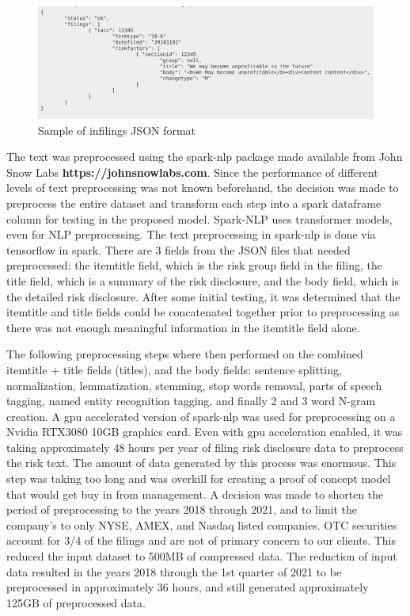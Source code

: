 \documentclass[11pt]{article}
\begin{document}
\vspace{5 mm}

\begin{figure}[htp]
\centering
\includegraphics[scale=0.16]{images/RiskFactorContent_Json.png}
\caption{Sample of infilings JSON format}
\label{jsonformat}
\end{figure}

\vspace{5 mm}

The text was preprocessed using the spark-nlp package made available from John Snow Labs \textbf{https://johnsnowlabs.com}.  Since the performance of different levels of text preprocessing was not known beforehand, the decision was made to preprocess the entire dataset and transform each step into a spark dataframe column for testing in the proposed model.  Spark-NLP uses transformer models, even for NLP preprocessing.  The text preprocessing in spark-nlp is done via tensorflow in spark.  There are 3 fields from the JSON files that needed preprocessed: the itemtitle field, which is the risk group field in the filing, the title field, which is a summary of the risk disclosure, and the body field, which is the detailed risk disclosure.  After some initial testing, it was determined that the itemtitle and title fields could be concatenated together prior to preprocessing as there was not enough meaningful information in the itemtitle field alone.  

\vspace{5 mm}

The following preprocessing steps where then performed on the combined itemtitle + title fields (titles), and the body fields: sentence splitting, normalization, lemmatization, stemming, stop words removal, parts of speech tagging, named entity recognition tagging, and finally 2 and 3 word N-gram creation.  A gpu accelerated version of spark-nlp was used for preprocessing on a Nvidia RTX3080 10GB graphics card.  Even with gpu acceleration enabled, it was taking approximately 48 hours per year of filing risk disclosure data to preprocess the risk text. The amount of data generated by this process was enormous.  This step was taking too long and was overkill for creating a proof of concept model that would get buy in from management.  A decision was made to shorten the period of preprocessing to the years 2018 through 2021, and to limit the company's to only NYSE, AMEX, and Nasdaq listed companies.  OTC securities account for 3/4 of the filings and are not of primary concern to our clients.  This reduced the input dataset to 500MB of compressed data.  The reduction of input data resulted in the years 2018 through the 1st quarter of 2021 to be preprocessed in approximately 36 hours, and still generated approximately 125GB of preprocessed data.
\end{document}
